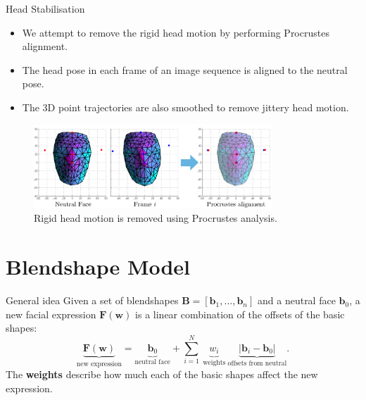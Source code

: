\documentclass{beamer}
\newcommand{\w}{\mathbf{w}}
\newcommand{\F}{\mathbf{F}}
\newcommand{\bb}{\mathbf{b}}
\begin{document}
\begin{frame}{Head Stabilisation}

\begin{itemize}
\setlength\itemsep{0.5em}
\item We attempt to remove the rigid head motion by performing Procrustes alignment.
\item The head pose in each frame of an image sequence is aligned to the neutral pose. 
\item The 3D point trajectories are also smoothed to remove jittery head motion. 
\end{itemize}

\begin{center}
\begin{figure}
\includegraphics[width=0.8\textwidth]{img/procrustes}
\caption{\tiny{Rigid head motion is removed using Procrustes analysis.}}
\end{figure}
\end{center}

\end{frame}

\section{Blendshape Model}
\begin{frame}{General idea}
Given a set of blendshapes $\mathbf{B} = [\bb_1, \ldots, \bb_n]$ and a neutral face $\bb_0$, a new facial expression $\mathbf{F(\w)}$ is a linear combination of the offsets of the basic shapes:
\begin{equation*}
	\underbrace{\F(\w)}_{\text{new expression}} = \underbrace{ \bb_0 }_{\text{neutral face}}+ \sum_{i=1}^N \: \underbrace{w_i}_{\text{weights}} \: \underbrace{|\bb_i - \bb_0|}_{\text{offsets from neutral}}.
\end{equation*}
The \textbf{weights} describe how much each of the basic shapes affect the new expression. 
\end{frame}
\end{document}
